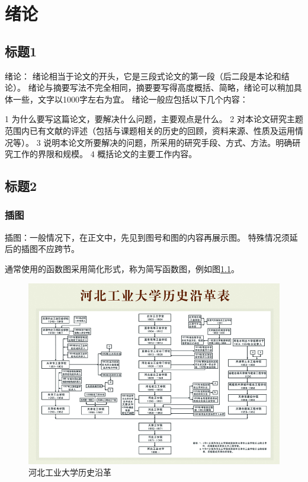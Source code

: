 \chapter{绪论}
\setcounter{page}{1}



\section{标题1}

绪论：
绪论相当于论文的开头，它是三段式论文的第一段（后二段是本论和结论）{\cite{chinesepainting}}。
绪论与摘要写法不完全相同，摘要要写得高度概括、简略，绪论可以稍加具体一些，文字以1000字左右为宜。
绪论一般应包括以下几个内容：

1 为什么要写这篇论文，要解决什么问题，主要观点是什么。
2 对本论文研究主题范围内已有文献的评述（包括与课题相关的历史的回顾，资料来源、性质及运用情况等）。
3 说明本论文所要解决的问题，所采用的研究手段、方式、方法。明确研究工作的界限和规模。
4 概括论文的主要工作内容。
\section{标题2}

\subsection{插图}
插图：一般情况下，在正文中，先见到图号和图的内容再展示图。
特殊情况须延后的插图不应跨节。

通常使用的函数图采用简化形式，称为简写函数图，例如图{\ref{fig:historyhebut}}。
\begin{figure}[ht]
    \centering
    \includegraphics[width=\textwidth]{figures/historyhebut}
    \caption{河北工业大学历史沿革}\label{fig:historyhebut}
\end{figure}

